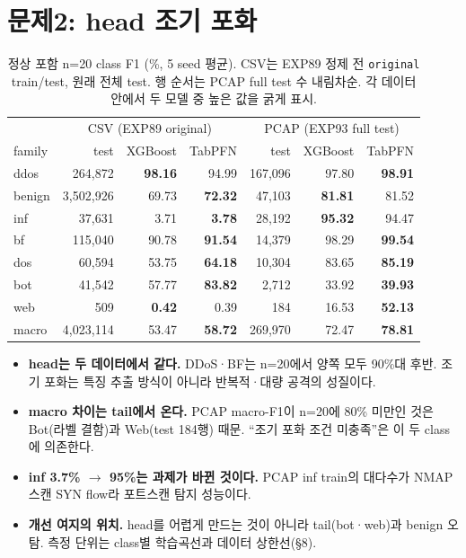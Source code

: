 \section{문제2: head 조기 포화}
\begin{table}[H]
\centering\small
\caption{정상 포함 n=20 class F1 (\%, 5 seed 평균). CSV는 EXP89 정제 전 \texttt{original} train/test, 원래 전체 test. 행 순서는 PCAP full test 수 내림차순. 각 데이터 안에서 두 모델 중 높은 값을 굵게 표시.}
\begin{tabular}{lrrrrrr}
\toprule
& \multicolumn{3}{c}{CSV (EXP89 original)} & \multicolumn{3}{c}{PCAP (EXP93 full test)}\\
family & test & XGBoost & TabPFN & test & XGBoost & TabPFN\\\midrule
ddos   & 264,872 & \textbf{98.16} & 94.99 & 167,096 & 97.80 & \textbf{98.91}\\
benign & 3,502,926 & 69.73 & \textbf{72.32} & 47,103 & \textbf{81.81} & 81.52\\
inf    & 37,631 & 3.71 & \textbf{3.78} & 28,192 & \textbf{95.32} & 94.47\\
bf     & 115,040 & 90.78 & \textbf{91.54} & 14,379 & 98.29 & \textbf{99.54}\\
dos    & 60,594 & 53.75 & \textbf{64.18} & 10,304 & 83.65 & \textbf{85.19}\\
bot    & 41,542 & 57.77 & \textbf{83.82} & 2,712 & 33.92 & \textbf{39.93}\\
web    & 509 & \textbf{0.42} & 0.39 & 184 & 16.53 & \textbf{52.13}\\\midrule
macro & 4,023,114 & 53.47 & \textbf{58.72} & 269,970 & 72.47 & \textbf{78.81}\\
\bottomrule
\end{tabular}
\end{table}

\begin{itemize}
\item \textbf{head는 두 데이터에서 같다.} DDoS·BF는 n=20에서 양쪽 모두 90\%대 후반. 조기 포화는 특징 추출 방식이 아니라 반복적·대량 공격의 성질이다.
\item \textbf{macro 차이는 tail에서 온다.} PCAP macro-F1이 n=20에 80\% 미만인 것은 Bot(라벨 결함)과 Web(test 184행) 때문. ``조기 포화 조건 미충족''은 이 두 class에 의존한다.
\item \textbf{inf 3.7\% $\to$ 95\%는 과제가 바뀐 것이다.} PCAP inf train의 대다수가 NMAP 스캔 SYN flow라 포트스캔 탐지 성능이다.
\item \textbf{개선 여지의 위치.} head를 어렵게 만드는 것이 아니라 tail(bot·web)과 benign 오탐. 측정 단위는 class별 학습곡선과 데이터 상한선(\S8).
\end{itemize}


